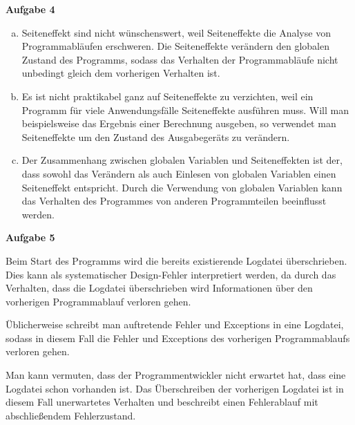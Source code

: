 \documentclass[a4paper,12pt]{article}
\newcommand{\Aufgabe}[1]{
  {
  \vspace*{0.5cm}
  \textsf{\textbf{Aufgabe #1}}
  \vspace*{0.2cm}

  }
}
\begin{document}
\Aufgabe{4}
\begin{enumerate}[a)]
  \item Seiteneffekt sind nicht wünschenswert, weil Seiteneffekte
        die Analyse von Programmabläufen erschweren.
        Die Seiteneffekte verändern den globalen Zustand des Programms,
        sodass das Verhalten der Programmabläufe nicht unbedingt
        gleich dem vorherigen Verhalten ist.
  \item Es ist nicht praktikabel ganz auf Seiteneffekte zu verzichten,
        weil ein Programm für viele Anwendungsfälle Seiteneffekte
        ausführen muss. Will man beispielsweise das Ergebnis einer
        Berechnung ausgeben, so verwendet man Seiteneffekte um den
        Zustand des Ausgabegeräts zu verändern.
  \item Der Zusammenhang zwischen globalen Variablen und Seiteneffekten
        ist der, dass sowohl das Verändern als auch Einlesen von globalen
        Variablen einen Seiteneffekt entspricht. Durch die Verwendung von
        globalen Variablen kann das Verhalten des Programmes von anderen
        Programmteilen beeinflusst werden.
\end{enumerate}

\Aufgabe{5}

Beim Start des Programms wird die bereits existierende Logdatei überschrieben.
Dies kann als systematischer Design-Fehler interpretiert werden, da durch
das Verhalten, dass die Logdatei überschrieben wird Informationen über den
vorherigen Programmablauf verloren gehen.

Üblicherweise schreibt man auftretende Fehler und Exceptions in eine Logdatei,
sodass in diesem Fall die Fehler und Exceptions des vorherigen Programmablaufs
verloren gehen.

Man kann vermuten, dass der Programmentwickler nicht erwartet hat, dass eine Logdatei
schon vorhanden ist. Das Überschreiben der vorherigen Logdatei ist in diesem Fall
unerwartetes Verhalten und beschreibt einen Fehlerablauf mit abschließendem Fehlerzustand.

\end{document}
